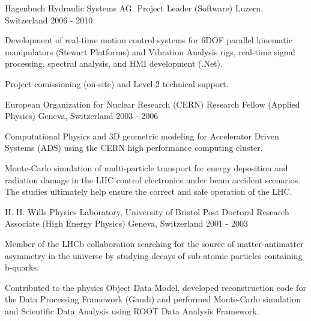\begin{cventries}
\cventry
{Hagenbuch Hydraulic Systems AG.} %
{Project Leader (Software)} %
{Luzern, Switzerland} %
{2006 - 2010} %
{
  \begin{cvitems} %
    \item {
        Development of real-time motion control systems for 6DOF parallel 
        kinematic manipulators (Stewart Platforms) and Vibration Analysis rigs,
        real-time signal processing, spectral analysis, and HMI development (.Net).}
    \item {
        Project comissioning (on-site) and Level-2 technical support.}
  \end{cvitems}
}

\cventry
{European Organization for Nuclear Research (CERN)} %
{Research Fellow (Applied Physics)} %
{Geneva, Switzerland} %
{2003 - 2006} %
{
  \begin{cvitems} %
    \item {
        Computational Physics and 3D geometric modeling for Accelerator Driven Systems (ADS) using the CERN 
        high performance computing cluster.}
    \item {
        Monte-Carlo simulation of multi-particle transport for energy deposition 
        and radiation damage in the LHC control electronics under 
        beam accident scenarios. The studies ultimately help ensure the correct  and 
        safe operation of the LHC.}
  \end{cvitems}
}

\cventry
{H. H. Wills Physics Laboratory, University of Bristol} %
{Post Doctoral Research Associate (High Energy Physics)} %
{Geneva, Switzerland} %
{2001 - 2003} %
{
  \begin{cvitems} %
    \item {
        Member of the LHCb collaboration searching for the source of matter-antimatter 
        asymmetry in the universe by studying decays of sub-atomic particles containing b-quarks.}
    \item {
        Contributed to the physics Object Data Model, developed reconstruction code 
        for the Data Processing Framework (Gaudi) and performed Monte-Carlo simulation
        and Scientific Data Analysis using ROOT Data Analysis Framework.}
  \end{cvitems}
}


\end{cventries}
